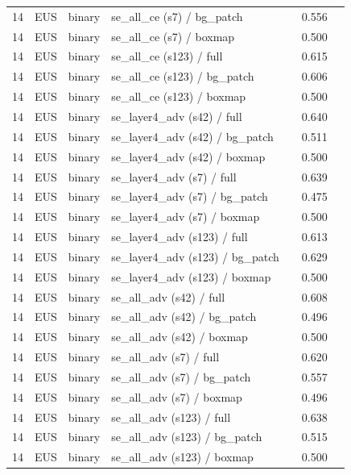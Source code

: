 \begin{longtable}{cL{1.1cm}L{1.5cm}L{5.6cm}ccc}
14 & EUS & binary & se\_all\_ce (s7) / bg\_patch & \nl{} & 0.556 & \nl{} \\
14 & EUS & binary & se\_all\_ce (s7) / boxmap & \nl{} & 0.500 & \nl{} \\
14 & EUS & binary & se\_all\_ce (s123) / full & \nl{} & 0.615 & \nl{} \\
14 & EUS & binary & se\_all\_ce (s123) / bg\_patch & \nl{} & 0.606 & \nl{} \\
14 & EUS & binary & se\_all\_ce (s123) / boxmap & \nl{} & 0.500 & \nl{} \\
14 & EUS & binary & se\_layer4\_adv (s42) / full & \nl{} & 0.640 & \nl{} \\
14 & EUS & binary & se\_layer4\_adv (s42) / bg\_patch & \nl{} & 0.511 & \nl{} \\
14 & EUS & binary & se\_layer4\_adv (s42) / boxmap & \nl{} & 0.500 & \nl{} \\
14 & EUS & binary & se\_layer4\_adv (s7) / full & \nl{} & 0.639 & \nl{} \\
14 & EUS & binary & se\_layer4\_adv (s7) / bg\_patch & \nl{} & 0.475 & \nl{} \\
14 & EUS & binary & se\_layer4\_adv (s7) / boxmap & \nl{} & 0.500 & \nl{} \\
14 & EUS & binary & se\_layer4\_adv (s123) / full & \nl{} & 0.613 & \nl{} \\
14 & EUS & binary & se\_layer4\_adv (s123) / bg\_patch & \nl{} & 0.629 & \nl{} \\
14 & EUS & binary & se\_layer4\_adv (s123) / boxmap & \nl{} & 0.500 & \nl{} \\
14 & EUS & binary & se\_all\_adv (s42) / full & \nl{} & 0.608 & \nl{} \\
14 & EUS & binary & se\_all\_adv (s42) / bg\_patch & \nl{} & 0.496 & \nl{} \\
14 & EUS & binary & se\_all\_adv (s42) / boxmap & \nl{} & 0.500 & \nl{} \\
14 & EUS & binary & se\_all\_adv (s7) / full & \nl{} & 0.620 & \nl{} \\
14 & EUS & binary & se\_all\_adv (s7) / bg\_patch & \nl{} & 0.557 & \nl{} \\
14 & EUS & binary & se\_all\_adv (s7) / boxmap & \nl{} & 0.496 & \nl{} \\
14 & EUS & binary & se\_all\_adv (s123) / full & \nl{} & 0.638 & \nl{} \\
14 & EUS & binary & se\_all\_adv (s123) / bg\_patch & \nl{} & 0.515 & \nl{} \\
14 & EUS & binary & se\_all\_adv (s123) / boxmap & \nl{} & 0.500 & \nl{} \\

\end{longtable}

